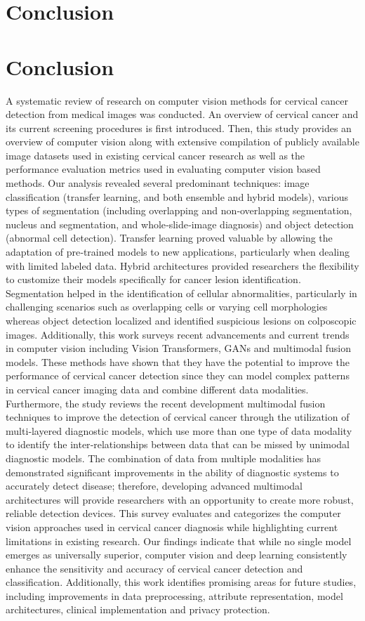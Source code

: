 \documentclass[final,5p,times,twocolumn,authoryear]{elsarticle}
\begin{document}
\section{Conclusion}

\section{Conclusion}
A systematic review of research on computer vision methods for cervical cancer detection from medical images was conducted. An overview of cervical cancer and its current screening procedures is first introduced. Then, this study provides an overview of computer vision along with extensive compilation of publicly available image datasets used in existing cervical cancer research as well as the performance evaluation metrics used in evaluating computer vision based methods. Our analysis revealed several predominant techniques: image classification (transfer learning, and both ensemble and hybrid models), various types of segmentation (including overlapping and non‑overlapping segmentation, nucleus and segmentation, and whole‑slide‑image diagnosis) and object detection (abnormal cell detection). Transfer learning proved valuable by allowing the adaptation of pre‑trained models to new applications, particularly when dealing with limited labeled data. Hybrid architectures provided researchers the flexibility to customize their models specifically for cancer lesion identification. Segmentation helped in the identification of cellular abnormalities, particularly in challenging scenarios such as overlapping cells or varying cell morphologies whereas object detection localized and identified suspicious lesions on colposcopic images.
Additionally, this work surveys recent advancements and current trends in computer vision including Vision Transformers, GANs and multimodal fusion models. These methods have shown that they have the potential to improve the performance of cervical cancer detection since they can model complex patterns in cervical cancer imaging data and combine different data modalities.
Furthermore, the study reviews the recent development multimodal fusion techniques to improve the detection of cervical cancer through the utilization of multi‑layered diagnostic models, which use more than one type of data modality to identify the inter‑relationships between data that can be missed by unimodal diagnostic models. The combination of data from multiple modalities has demonstrated significant improvements in the ability of diagnostic systems to accurately detect disease; therefore, developing advanced multimodal architectures will provide researchers with an opportunity to create more robust, reliable detection devices.
This survey evaluates and categorizes the computer vision approaches used in cervical cancer diagnosis while highlighting current limitations in existing research. Our findings indicate that while no single model emerges as universally superior, computer vision and deep learning consistently enhance the sensitivity and accuracy of cervical cancer detection and classification. Additionally, this work identifies promising areas for future studies, including improvements in data preprocessing, attribute representation, model architectures, clinical implementation and privacy protection.
\end{document}
